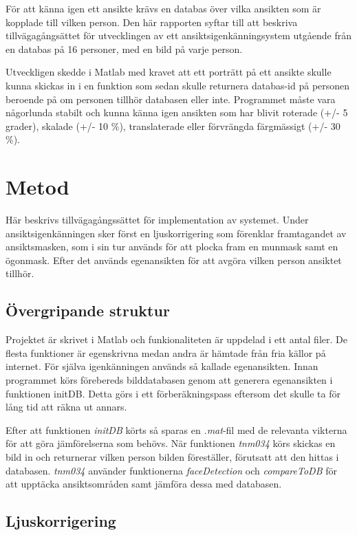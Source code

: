 \documentclass[a4paper,12pt,oneside,final]{extbook}
\begin{document}
För att känna igen ett ansikte krävs en databas över vilka ansikten som är kopplade till vilken person. Den här rapporten syftar till att beskriva tillvägagångsättet för utvecklingen av ett ansiktsigenkänningsystem utgående från en databas på 16 personer, med en bild på varje person.

Utveckligen skedde i Matlab med kravet att ett porträtt på ett ansikte skulle kunna skickas in i en funktion som sedan skulle returnera databas-id på personen beroende på om personen tillhör databasen eller inte. Programmet måste vara någorlunda stabilt och kunna känna igen ansikten som har blivit roterade (+/- 5 grader), skalade (+/- 10 \%), translaterade eller förvrängda färgmässigt (+/- 30 \%).

\chapter{Metod}

Här beskrivs tillvägagångssättet för implementation av systemet. Under ansiktsigenkänningen sker först en ljuskorrigering som förenklar framtagandet av ansiktsmasken, som i sin tur används för att plocka fram en munmask samt en ögonmask. Efter det används egenansikten för att avgöra vilken person ansiktet tillhör.

\section{Övergripande struktur}

Projektet är skrivet i Matlab och funkionaliteten är uppdelad i ett antal filer. De flesta funktioner är egenskrivna medan andra är hämtade från fria källor på internet. För själva igenkänningen används så kallade egenansikten. Innan programmet körs förebereds bilddatabasen genom att generera egenansikten i funktionen initDB. Detta görs i ett förberäkningspass eftersom det skulle ta för lång tid att räkna ut annars.

Efter att funktionen \textit{initDB} körts så sparas en \textit{.mat}-fil med de relevanta vikterna för att göra jämförelserna som behövs. När funktionen \textit{tnm034} körs skickas en bild in och returnerar vilken person bilden föreställer, förutsatt att den hittas i databasen. \textit{tnm034} använder funktionerna \textit{faceDetection} och \textit{compareToDB} för att upptäcka ansiktsområden samt jämföra dessa med databasen.

\section{Ljuskorrigering}
\end{document}

